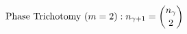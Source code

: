 \documentclass[preview]{standalone}
\begin{document}
\begin{align*}
\special{dvisvgm:raw <g id='unique000'>}\text{Phase Trichotomy } (m=2): n_{\gamma+1}=\binom{n_\gamma}{2}\special{dvisvgm:raw </g>}
\end{align*}
\end{document}

